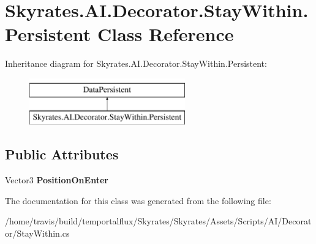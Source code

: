 \hypertarget{class_skyrates_1_1_a_i_1_1_decorator_1_1_stay_within_1_1_persistent}{\section{Skyrates.\-A\-I.\-Decorator.\-Stay\-Within.\-Persistent Class Reference}
\label{class_skyrates_1_1_a_i_1_1_decorator_1_1_stay_within_1_1_persistent}
}
Inheritance diagram for Skyrates.\-A\-I.\-Decorator.\-Stay\-Within.\-Persistent\-:\begin{figure}[H]
\begin{center}
\leavevmode
\includegraphics[height=2.000000cm]{class_skyrates_1_1_a_i_1_1_decorator_1_1_stay_within_1_1_persistent}
\end{center}
\end{figure}
\subsection*{Public Attributes}
\begin{DoxyCompactItemize}
\item 
\hypertarget{class_skyrates_1_1_a_i_1_1_decorator_1_1_stay_within_1_1_persistent_a3263f59b8fbfe14b2b2f55bdc2047115}{Vector3 {\bfseries Position\-On\-Enter}}\label{class_skyrates_1_1_a_i_1_1_decorator_1_1_stay_within_1_1_persistent_a3263f59b8fbfe14b2b2f55bdc2047115}

\end{DoxyCompactItemize}


The documentation for this class was generated from the following file\-:\begin{DoxyCompactItemize}
\item 
/home/travis/build/temportalflux/\-Skyrates/\-Skyrates/\-Assets/\-Scripts/\-A\-I/\-Decorator/Stay\-Within.\-cs\end{DoxyCompactItemize}
